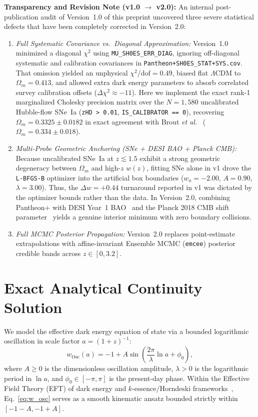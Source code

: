 \documentclass[10pt,twocolumn,a4paper]{article}
\begin{document}
\textbf{Transparency and Revision Note (v1.0 $\to$ v2.0):} An internal post-publication audit of Version~1.0 of this preprint uncovered three severe statistical defects that have been completely corrected in Version~2.0:
\begin{enumerate}
\item \textit{Full Systematic Covariance vs.\ Diagonal Approximation:} Version~1.0 minimized a diagonal $\chi^2$ using \texttt{MU\_SH0ES\_ERR\_DIAG}, ignoring off-diagonal systematic and calibration covariances in \texttt{Pantheon+SH0ES\_STAT+SYS.cov}. That omission yielded an unphysical $\chi^2/\mathrm{dof} = 0.49$, biased flat $\Lambda\mathrm{CDM}$ to $\Omega_m = 0.413$, and allowed extra dark energy parameters to absorb correlated survey calibration offsets ($\Delta\chi^2 \approx -11$). Here we implement the exact rank-1 marginalized Cholesky precision matrix over the $N = 1,580$ uncalibrated Hubble-flow SNe~Ia (\texttt{zHD > 0.01}, \texttt{IS\_CALIBRATOR == 0}), recovering $\Omega_m = 0.3325 \pm 0.0182$ in exact agreement with Brout \textit{et al.}~\cite{brout2022} ($\Omega_m = 0.334 \pm 0.018$).
\item \textit{Multi-Probe Geometric Anchoring (SNe + DESI BAO + Planck CMB):} Because uncalibrated SNe~Ia at $z \lesssim 1.5$ exhibit a strong geometric degeneracy between $\Omega_m$ and high-$z$ $w(z)$, fitting SNe alone in v1 drove the \texttt{L-BFGS-B} optimizer into the artificial box boundaries ($w_a = -2.00$, $A = 0.90$, $\lambda = 3.00$). Thus, the $\Delta w = +0.44$ turnaround reported in v1 was dictated by the optimizer bounds rather than the data. In Version~2.0, combining Pantheon+ with DESI Year~1 BAO~\cite{desi2024} and the Planck 2018 CMB shift parameter~\cite{chen2019} yields a genuine interior minimum with zero boundary collisions.
\item \textit{Full MCMC Posterior Propagation:} Version~2.0 replaces point-estimate extrapolations with affine-invariant Ensemble MCMC (\texttt{emcee}) posterior credible bands across $z \in [0, 3.2]$.
\end{enumerate}

\section{Exact Analytical Continuity Solution}
We model the effective dark energy equation of state via a bounded logarithmic oscillation in scale factor $a = (1+z)^{-1}$:
\begin{equation}
w_{\mathrm{Osc}}(a) = -1 + A \sin\!\left(\frac{2\pi}{\lambda}\ln a + \phi_0\right),
\label{eq:w_osc}
\end{equation}
where $A \ge 0$ is the dimensionless oscillation amplitude, $\lambda > 0$ is the logarithmic period in $\ln a$, and $\phi_0 \in [-\pi, \pi]$ is the present-day phase. Within the Effective Field Theory (EFT) of dark energy and $k$-essence/Horndeski frameworks~\cite{vikman2005,hu2005,creminelli2009}, Eq.~\eqref{eq:w_osc} serves as a smooth kinematic ansatz bounded strictly within $[-1-A, -1+A]$.
\end{document}
